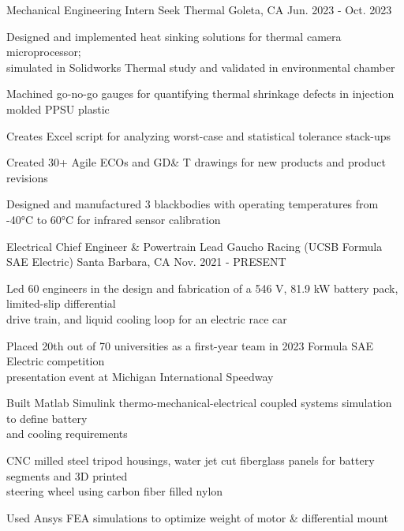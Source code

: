 

\begin{cventries}

\cventry
{Mechanical Engineering Intern} %
{Seek Thermal} %
{Goleta, CA} %
{Jun. 2023 - Oct. 2023} %
{ %
\begin{cvitems}
\item{Designed and implemented heat sinking solutions for thermal camera microprocessor; \\ simulated in Solidworks Thermal study and validated in environmental chamber}
\item{Machined go-no-go gauges for quantifying thermal shrinkage defects in injection molded PPSU plastic}
\item{Creates Excel script for analyzing worst-case and statistical tolerance stack-ups}
\item{Created 30+ Agile ECOs and GD\& T drawings for new products and product revisions}
\item{Designed and manufactured 3 blackbodies with operating temperatures from -40°C to 60°C for infrared sensor calibration}
\end{cvitems}
}

\cventry
{Electrical Chief Engineer \& Powertrain Lead} %
{Gaucho Racing (UCSB Formula SAE Electric)} %
{Santa Barbara, CA} %
{Nov. 2021 - PRESENT} %
{ %
\begin{cvitems}   
\item {Led 60 engineers in the design and fabrication of a 546 V, 81.9 kW battery pack, limited-slip differential \\ drive train, and liquid cooling loop for an electric race car}
\item {Placed 20th out of 70 universities as a first-year team in 2023 Formula SAE Electric competition\\ presentation event at Michigan International Speedway}
\item {Built Matlab Simulink thermo-mechanical-electrical coupled systems simulation to define battery \\ and cooling requirements}
\item {CNC milled steel tripod housings, water jet cut fiberglass panels for battery segments and 3D printed \\ steering wheel using carbon fiber filled nylon}
\item {Used Ansys FEA simulations to optimize weight of motor \&  differential mount}
\end{cvitems}
}



\end{cventries}
